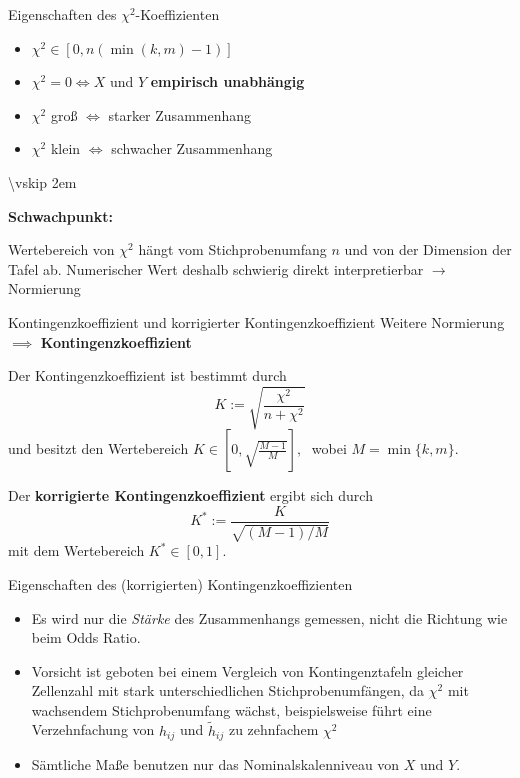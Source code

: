 \documentclass[
  10pt,
  ignorenonframetext,
]{beamer}
\providecommand{\tightlist}{%
  \setlength{\itemsep}{0pt}\setlength{\parskip}{0pt}}
\begin{document}
\begin{frame}{Eigenschaften des \(\chi^2\)-Koeffizienten}
\label{eigenschaften-des-chi2-koeffizienten}
\begin{itemize}
\tightlist
\item
  \(\chi^2 \in [0, n (\min(k, m) - 1)]\)
\item
  \(\chi^2 = 0 \iff X\) und \(Y\) \textbf{empirisch unabhängig}
\item
  \(\chi^2\) groß \(\iff\) starker Zusammenhang
\item
  \(\chi^2\) klein \(\iff\) schwacher Zusammenhang
\end{itemize}

\textbackslash vskip 2em

\textbf{Schwachpunkt:}

Wertebereich von \(\chi^2\) hängt vom Stichprobenumfang \(n\) und von
der Dimension der Tafel ab. Numerischer Wert deshalb schwierig direkt
interpretierbar \(\rightarrow\) Normierung
\end{frame}

\begin{frame}{Kontingenzkoeffizient und korrigierter
Kontingenzkoeffizient}
\label{kontingenzkoeffizient-und-korrigierter-kontingenzkoeffizient}
Weitere Normierung \(\implies\) \textbf{Kontingenzkoeffizient}

Der Kontingenzkoeffizient ist bestimmt durch \begin{displaymath}
K :=\sqrt{\frac{\chi^2}{n+\chi^2}}
\end{displaymath} und besitzt den Wertebereich
\(K\in\left[0,\sqrt{\frac{M-1}{M}}\right],\;\) wobei \(M=\min\{k,m\}.\)

Der \textbf{korrigierte Kontingenzkoeffizient} ergibt sich durch
\[K^* := \frac{K}{\sqrt{(M-1)/M}}\] mit dem Wertebereich
\(K^*\in[0,1]\).
\end{frame}

\begin{frame}{Eigenschaften des (korrigierten) Kontingenzkoeffizienten}
\label{eigenschaften-des-korrigierten-kontingenzkoeffizienten}
\begin{itemize}
\tightlist
\item
  Es wird nur die \emph{Stärke} des Zusammenhangs gemessen, nicht die
  Richtung wie beim Odds Ratio.
\item
  Vorsicht ist geboten bei einem Vergleich von Kontingenztafeln gleicher
  Zellenzahl mit stark unterschiedlichen Stichprobenumfängen, da
  \(\chi^2\) mit wachsendem Stichprobenumfang wächst, beispielsweise
  führt eine Verzehnfachung von \(h_{ij}\) und \(\tilde h_{ij}\) zu
  zehnfachem \(\chi^2\)
\item
  Sämtliche Maße benutzen nur das Nominalskalenniveau von \(X\) und
  \(Y\).
\end{itemize}
\end{frame}
\end{document}
